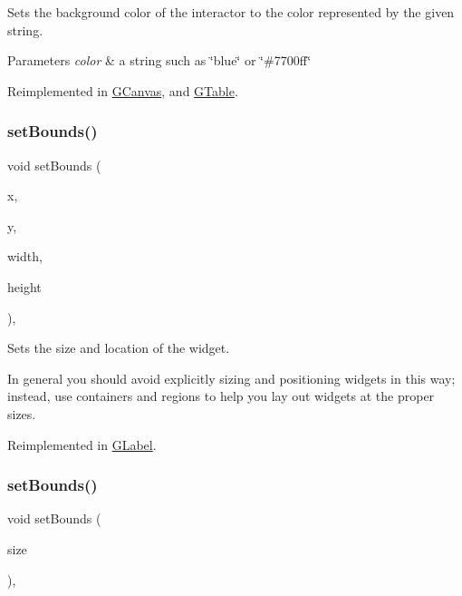 Sets the background color of the interactor to the color represented by the given string. 


\begin{DoxyParams}{Parameters}
{\em color} & a string such as \char`\"{}blue\char`\"{} or \char`\"{}\#7700ff\char`\"{} \\
\hline
\end{DoxyParams}


Reimplemented in \mbox{\hyperlink{classGCanvas_a222fcfb542aa6094c7e0de671bd69627}{G\+Canvas}}, and \mbox{\hyperlink{classGTable_a222fcfb542aa6094c7e0de671bd69627}{G\+Table}}.

\mbox{\label{classGInteractor_a2aae8197624b72265ab83b4f1bc73f2f}} 
\subsubsection{\texorpdfstring{set\+Bounds()}{setBounds()}\hspace{0.1cm}{\footnotesize\ttfamily [1/2]}}
{\footnotesize\ttfamily void set\+Bounds (\begin{DoxyParamCaption}\item[{double}]{x,  }\item[{double}]{y,  }\item[{double}]{width,  }\item[{double}]{height }\end{DoxyParamCaption})\hspace{0.3cm}{\ttfamily [virtual]}, {\ttfamily [inherited]}}



Sets the size and location of the widget. 

In general you should avoid explicitly sizing and positioning widgets in this way; instead, use containers and regions to help you lay out widgets at the proper sizes. 

Reimplemented in \mbox{\hyperlink{classGLabel_aab3121dc97f8c5c1ddee39ea81d08509}{G\+Label}}.

\mbox{\label{classGInteractor_acada386653f008cacc7cce86426bef7c}} 
\subsubsection{\texorpdfstring{set\+Bounds()}{setBounds()}\hspace{0.1cm}{\footnotesize\ttfamily [2/2]}}
{\footnotesize\ttfamily void set\+Bounds (\begin{DoxyParamCaption}\item[{const \mbox{\hyperlink{classGRectangle}{G\+Rectangle}} \&}]{size }\end{DoxyParamCaption})\hspace{0.3cm}{\ttfamily [virtual]}, {\ttfamily [inherited]}}



